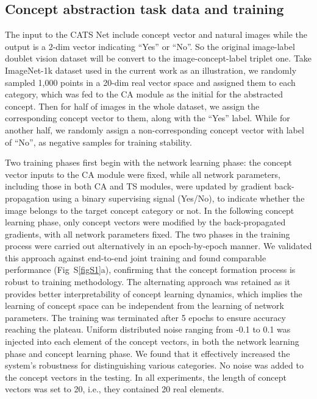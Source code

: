 \documentclass[pdflatex,sn-mathphys-num,lineno]{sn-jnl}%
\begin{document}
\begin{CJK}{UTF8}{gbsn}
\subsection{Concept abstraction task data and training}

The input to the CATS Net include concept vector and natural images while the output is a 2-dim vector indicating “Yes” or “No”. So the original image-label doublet vision dataset will be convert to the image-concept-label triplet one. Take ImageNet-1k dataset used in the current work as an illustration, we randomly sampled 1,000 points in a 20-dim real vector space and assigned them to each category, which was fed to the CA module as the initial for the abstracted concept. Then for half of images in the whole dataset, we assign the corresponding concept vector to them, along with the “Yes” label. While for another half, we randomly assign a non-corresponding concept vector with label of “No”, as negative samples for training stability. 

Two training phases first begin with the network learning phase: the concept vector inputs to the CA module were fixed, while all network parameters, including those in both CA and TS modules, were updated by gradient back-propagation using a binary supervising signal (Yes/No), to indicate whether the image belongs to the target concept category or not. In the following concept learning phase, only concept vectors were modified by the back-propagated gradients, with all network parameters fixed. The two phases in the training process were carried out alternatively in an epoch-by-epoch manner. We validated this approach against end-to-end joint training and found comparable performance (Fig~S\ref{figS1}a), confirming that the concept formation process is robust to training methodology. The alternating approach was retained as it provides better interpretability of concept learning dynamics, which implies the learning of concept space can be independent from the learning of network parameters. The training was terminated after 5 epochs to ensure accuracy reaching the plateau. Uniform distributed noise ranging from -0.1 to 0.1 was injected into each element of the concept vectors, in both the network learning phase and concept learning phase. We found that it effectively increased the system’s robustness for distinguishing various categories. No noise was added to the concept vectors in the testing. In all experiments, the length of concept vectors was set to 20, i.e., they contained 20 real elements.


\end{CJK}
\end{document}
